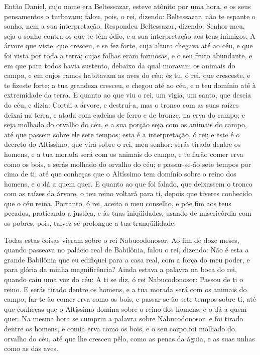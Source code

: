 Então Daniel, cujo nome era Beltessazar, esteve atônito por uma
hora, e os seus pensamentos o turbavam; falou, pois, o rei, dizendo:
Beltessazar, não te espante o sonho, nem a sua interpretação.
Respondeu Beltessazar, dizendo: Senhor meu, seja o sonho contra os
que te têm ódio, e a sua interpretação aos teus inimigos. A
árvore que viste, que cresceu, e se fez forte, cuja altura chegava
até ao céu, e que foi vista por toda a terra; cujas folhas
eram formosas, e o seu fruto abundante, e em que para todos havia
sustento, debaixo da qual moravam os animais do campo, e em cujos
ramos habitavam as aves do céu; és tu, ó rei, que cresceste,
e te fizeste forte; a tua grandeza cresceu, e chegou até ao céu, e o
teu domínio até à extremidade da terra. E quanto ao que viu o
rei, um vigia, um santo, que descia do céu, e dizia: Cortai a
árvore, e destruí-a, mas o tronco com as suas raízes deixai na
terra, e atada com cadeias de ferro e de bronze, na erva do campo; e
seja molhado do orvalho do céu, e a sua porção seja com os animais
do campo, até que passem sobre ele sete tempos; esta é a
interpretação, ó rei; e este é o decreto do Altíssimo, que virá
sobre o rei, meu senhor: serás tirado dentre os homens, e a
tua morada será com os animais do campo, e te farão comer erva como
os bois, e serás molhado do orvalho do céu; e passar-se-ão sete
tempos por cima de ti; até que conheças que o Altíssimo tem domínio
sobre o reino dos homens, e o dá a quem quer. E quanto ao que
foi falado, que deixassem o tronco com as raízes da árvore, o teu
reino voltará para ti, depois que tiveres conhecido que o céu reina.
Portanto, ó rei, aceita o meu conselho, e põe fim aos teus
pecados, praticando a justiça, e às tuas iniqüidades, usando de
misericórdia com os pobres, pois, talvez se prolongue a tua
tranqüilidade.

Todas estas coisas vieram sobre o rei Nabucodonosor. Ao
fim de doze meses, quando passeava no palácio real de Babilônia,
falou o rei, dizendo: Não é esta a grande Babilônia que eu
edifiquei para a casa real, com a força do meu poder, e para glória
da minha magnificência? Ainda estava a palavra na boca do
rei, quando caiu uma voz do céu: A ti se diz, ó rei Nabucodonosor:
Passou de ti o reino. E serás tirado dentre os homens, e a
tua morada será com os animais do campo; far-te-ão comer erva como
os bois, e passar-se-ão sete tempos sobre ti, até que conheças que o
Altíssimo domina sobre o reino dos homens, e o dá a quem quer.
Na mesma hora se cumpriu a palavra sobre Nabucodonosor, e foi
tirado dentre os homens, e comia erva como os bois, e o seu corpo
foi molhado do orvalho do céu, até que lhe cresceu pêlo, como as
penas da águia, e as suas unhas como as das aves.

